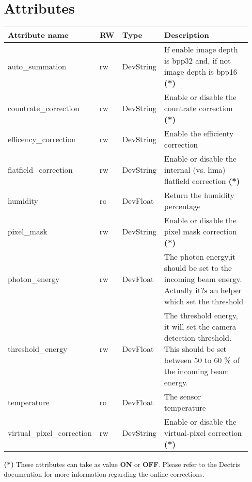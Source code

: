 \documentclass[letterpaper,10pt,english]{sphinxmanual}
\begin{document}
\section{Attributes}
\label{Eiger/eiger:attributes}
\begin{tabulary}{\linewidth}{|L|L|L|L|}
\hline
\textsf{\relax 
Attribute name
} & \textsf{\relax 
RW
} & \textsf{\relax 
Type
} & \textsf{\relax 
Description
}\\
\hline
auto\_summation
 & 
rw
 & 
DevString
 & 
If enable image depth is bpp32 and, if not image depth is bpp16 \textbf{(*)}
\\
\hline
countrate\_correction
 & 
rw
 & 
DevString
 & 
Enable or disable the countrate correction \textbf{(*)}
\\
\hline
efficency\_correction
 & 
rw
 & 
DevString
 & 
Enable the efficienty correction
\\
\hline
flatfield\_correction
 & 
rw
 & 
DevString
 & 
Enable or disable the internal (vs. lima) flatfield correction \textbf{(*)}
\\
\hline
humidity
 & 
ro
 & 
DevFloat
 & 
Return the humidity percentage
\\
\hline
pixel\_mask
 & 
rw
 & 
DevString
 & 
Enable or disable the pixel mask correction \textbf{(*)}
\\
\hline
photon\_energy
 & 
rw
 & 
DevFloat
 & 
The photon energy,it should be set to the incoming beam energy. Actually it?s an helper which set the threshold
\\
\hline
threshold\_energy
 & 
rw
 & 
DevFloat
 & 
The threshold energy, it will set the camera detection threshold. This should be set between 50 to 60 \% of the incoming beam energy.
\\
\hline
temperature
 & 
ro
 & 
DevFloat
 & 
The sensor temperature
\\
\hline
virtual\_pixel\_correction
 & 
rw
 & 
DevString
 & 
Enable or disable the virtual-pixel correction \textbf{(*)}
\\
\hline\end{tabulary}


\textbf{(*)} These attributes can take as value \textbf{ON} or \textbf{OFF}. Please refer to the Dectris documention for more information regarding
the online corrections.
\end{document}

